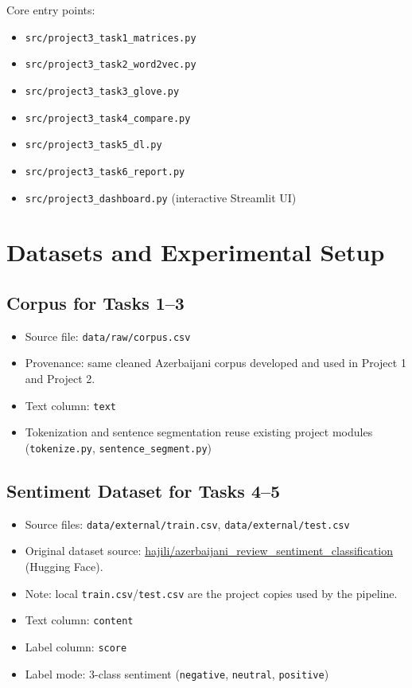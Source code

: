 \documentclass[11pt]{article}
\begin{document}
Core entry points:
\begin{itemize}
    \item \texttt{src/project3\_task1\_matrices.py}
    \item \texttt{src/project3\_task2\_word2vec.py}
    \item \texttt{src/project3\_task3\_glove.py}
    \item \texttt{src/project3\_task4\_compare.py}
    \item \texttt{src/project3\_task5\_dl.py}
    \item \texttt{src/project3\_task6\_report.py}
    \item \texttt{src/project3\_dashboard.py} (interactive Streamlit UI)
\end{itemize}

\section{Datasets and Experimental Setup}
\subsection{Corpus for Tasks 1--3}
\begin{itemize}
    \item Source file: \texttt{data/raw/corpus.csv}
    \item Provenance: same cleaned Azerbaijani corpus developed and used in Project 1 and Project 2.
    \item Text column: \texttt{text}
    \item Tokenization and sentence segmentation reuse existing project modules (\texttt{tokenize.py}, \texttt{sentence\_segment.py})
\end{itemize}

\subsection{Sentiment Dataset for Tasks 4--5}
\begin{itemize}
    \item Source files: \texttt{data/external/train.csv}, \texttt{data/external/test.csv}
    \item Original dataset source: \href{https://huggingface.co/datasets/hajili/azerbaijani_review_sentiment_classification/}{hajili/azerbaijani\_review\_sentiment\_classification} (Hugging Face).
    \item Note: local \texttt{train.csv}/\texttt{test.csv} are the project copies used by the pipeline.
    \item Text column: \texttt{content}
    \item Label column: \texttt{score}
    \item Label mode: 3-class sentiment (\texttt{negative}, \texttt{neutral}, \texttt{positive})
\end{itemize}
\end{document}
